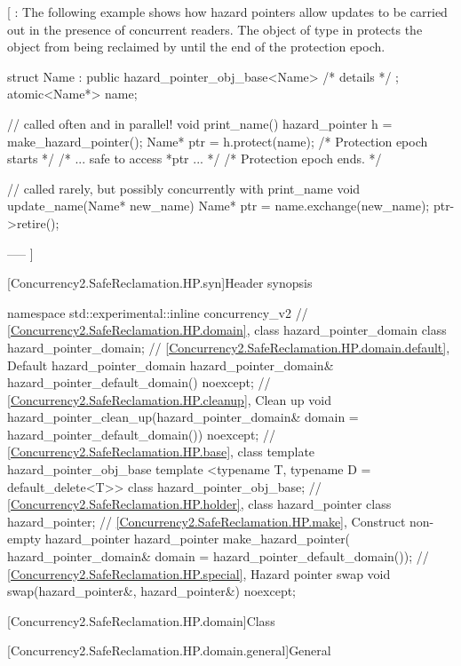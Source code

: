 [ : The following example shows how hazard pointers allow updates to be carried out in the presence of concurrent readers. The object of type  in  protects the object  from being reclaimed by  until the end of the protection epoch.

\begin{codeblock}
struct Name : public hazard_pointer_obj_base<Name> { /* details */ };
atomic<Name*> name;

// called often and in parallel!
void print_name() {
  hazard_pointer h = make_hazard_pointer();
  Name* ptr = h.protect(name); /* Protection epoch starts */
  /* ... safe to access *ptr ... */
} /* Protection epoch ends. */

// called rarely, but possibly concurrently with print_name
void update_name(Name* new_name) {
  Name* ptr = name.exchange(new_name);
  ptr->retire();
}
\end{codeblock}
--—  ]


[Concurrency2.SafeReclamation.HP.syn]{Header  synopsis}

\begin{codeblock}
namespace std::experimental::inline concurrency_v2 {
  // \ref{Concurrency2.SafeReclamation.HP.domain}, class hazard_pointer_domain
  class hazard_pointer_domain;
  // \ref{Concurrency2.SafeReclamation.HP.domain.default}, Default hazard_pointer_domain
  hazard_pointer_domain& hazard_pointer_default_domain() noexcept;
  // \ref{Concurrency2.SafeReclamation.HP.cleanup}, Clean up
  void hazard_pointer_clean_up(hazard_pointer_domain& domain = hazard_pointer_default_domain())
    noexcept;
  // \ref{Concurrency2.SafeReclamation.HP.base}, class template hazard_pointer_obj_base
  template <typename T, typename D = default_delete<T>> class hazard_pointer_obj_base;
  // \ref{Concurrency2.SafeReclamation.HP.holder}, class hazard_pointer
  class hazard_pointer;
  // \ref{Concurrency2.SafeReclamation.HP.make}, Construct non-empty hazard_pointer
  hazard_pointer make_hazard_pointer(
    hazard_pointer_domain& domain = hazard_pointer_default_domain());
  // \ref{Concurrency2.SafeReclamation.HP.special}, Hazard pointer swap
  void swap(hazard_pointer&, hazard_pointer&) noexcept;
}
\end{codeblock}

[Concurrency2.SafeReclamation.HP.domain]{Class }

[Concurrency2.SafeReclamation.HP.domain.general]{General}

